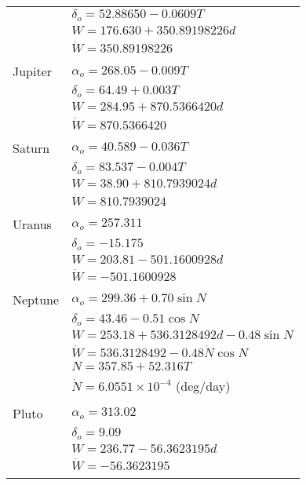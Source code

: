 {\begin{table*}
\begin{tabular}{p{.5 in} p{4.5 in} }
       & $\delta_o = 52.88650 - 0.0609T$\\
       & $W = 176.630 + 350.89198226d$\\
       &$\dot{W} = 350.89198226$\\
       & \\
    Jupiter & $\alpha_o = 268.05 - 0.009T$\\
       & $\delta_o = 64.49 + 0.003T$\\
       & $W = 284.95 + 870.5366420d$\\
       &$\dot{W} = 870.5366420$\\
       & \\
    Saturn & $\alpha_o = 40.589 - 0.036T$\\
       & $\delta_o = 83.537 - 0.004T$\\
       & $W =  38.90 + 810.7939024d$\\
       &$\dot{W} = 810.7939024$\\
       & \\
    Uranus & $\alpha_o = 257.311$\\
       & $\delta_o = -15.175$\\
       & $W = 203.81-501.1600928d$\\
       &$\dot{W} = -501.1600928$\\
       & \\
     Neptune & $\alpha_o = 299.36 + 0.70\sin{N}$\\
       & $\delta_o = 43.46 - 0.51\cos{N}$\\
       & $W = 253.18 + 536.3128492d - 0.48 \sin{N}$\\
       &$\dot{W} = 536.3128492- 0.48\dot{N} \cos{N}$\\
       &$N = 357.85 + 52.316T$\\
       &$\dot{N} = 6.0551\times 10^{-4}$ \hspace{.2in}(deg/day)\\
       & \\
     Pluto & $\alpha_o = 313.02$\\
       & $\delta_o = 9.09$\\
       & $W = 236.77 - 56.3623195d$\\
       &$\dot{W} = - 56.3623195$\\
  \hline\hline \label{Table:PlanetsPolesMeridians}
\end{tabular}
\end{table*}

}
